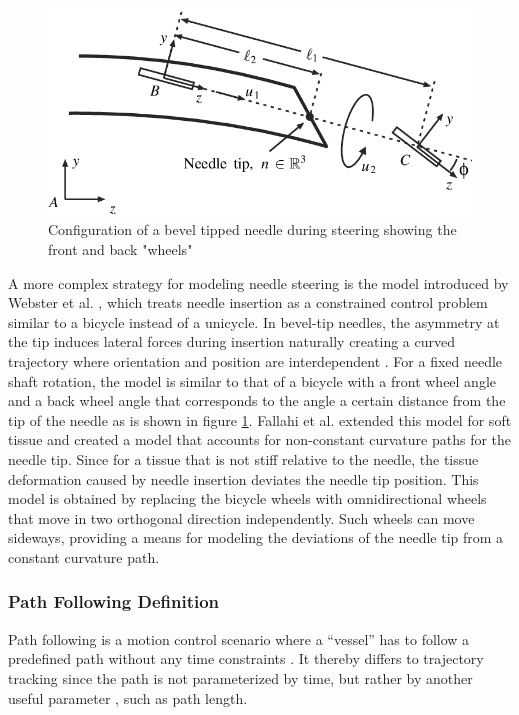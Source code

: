 \begin{figure}
    \centering
    \includegraphics[width=0.7\linewidth]{images/steerableNeedles/Configuration-of-a-bevel-tip-needle-during-steering-showing-the-front-and-back-wheels.png}
    \caption{Configuration of a bevel tipped needle during steering showing the front and back "wheels" \cite{webster_nonholonomic_2006}}
    \label{fig:bicycle}
\end{figure}
A more complex strategy for modeling needle steering is the  model introduced by Webster et al. \cite{webster_nonholonomic_2006}, which treats needle insertion as a constrained control problem similar to a bicycle instead of a unicycle. In bevel-tip needles, the asymmetry at the tip induces lateral forces during insertion naturally creating a curved trajectory where orientation and position are interdependent \cite{misra_mechanics_2010}. For a fixed needle shaft rotation, the model is similar to that of a bicycle with a front wheel angle and a back wheel angle that corresponds to the angle a certain distance from the tip of the needle \cite{webster_nonholonomic_2006} as is shown in figure \ref{fig:bicycle}.
\newline \newline
Fallahi et al. extended this model for soft tissue and created a model that accounts for non-constant curvature paths for the needle tip. Since for a tissue that is not stiff relative to the needle, the tissue deformation caused by needle insertion deviates the needle tip position. This model is obtained by replacing the bicycle wheels with omnidirectional wheels that move in two orthogonal direction independently. Such wheels can move sideways, providing a means for modeling the deviations of the needle tip from a constant curvature path. \cite{fallahi_extended_2015}


\subsubsection{Path Following Definition}
Path following is a  motion control scenario where a “vessel” has to follow a predefined path without any time constraints \cite{caharija_integral_2016}. It thereby differs to trajectory tracking since the path is not parameterized by time, but rather by another useful parameter \cite{hung_review_2023}, such as path length. 

